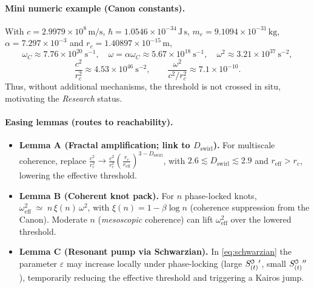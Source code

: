 \documentclass[reprint,aps,onecolumn,nofootinbib]{revtex4-2}
\newcommand{\swirlarrow}{%
    \mathchoice{\mkern-2mu\scriptstyle\boldsymbol{\circlearrowleft}}%
    {\mkern-2mu\scriptstyle\boldsymbol{\circlearrowleft}}%
    {\mkern-2mu\scriptscriptstyle\boldsymbol{\circlearrowleft}}%
    {\mkern-2mu\scriptscriptstyle\boldsymbol{\circlearrowleft}}%
}
\newcommand{\SwirlClock}{S_{(t)}^{\swirlarrow}}
\newcommand{\rc}{r_c}                                    %
\providecommand{\rc}{r_c}
\begin{document}
        \paragraph{Mini numeric example (Canon constants).}
            With $c=2.9979\times10^8\,\mathrm{m/s}$, $\hbar=1.0546\times10^{-34}\,\mathrm{J\,s}$,
            $m_e=9.1094\times10^{-31}\,\mathrm{kg}$, $\alpha=7.297\times10^{-3}$ and $\rc=1.40897\times10^{-15}\,\mathrm{m}$,
            \[
                \omega_C \!\approx\! 7.76\times10^{20}\ \mathrm{s^{-1}},
                \quad
                \omega=\alpha\omega_C \!\approx\! 5.67\times10^{18}\ \mathrm{s^{-1}},
                \quad
                \omega^2 \!\approx\! 3.21\times10^{37}\ \mathrm{s^{-2}},
            \]
            \[
                \frac{c^2}{\rc^2}\!\approx\! 4.53\times10^{46}\ \mathrm{s^{-2}},
                \qquad
                \frac{\omega^2}{c^2/\rc^2}\!\approx\! 7.1\times10^{-10}.
            \]
            Thus, without additional mechanisms, the threshold is not crossed in situ, motivating the \emph{Research} status.

        \paragraph{Easing lemmas (routes to reachability).}
            \begin{itemize}
            \item \textbf{Lemma A (Fractal amplification; link to $D_{\mathrm{swirl}}$).}
            For multiscale coherence, replace
            $\displaystyle \frac{c^2}{\rc^2}\to \frac{c^2}{\rc^2}\!\left(\frac{\rc}{r_{\mathrm{eff}}}\right)^{3-D_{\mathrm{swirl}}}$,
            with $2.6\!\lesssim\!D_{\mathrm{swirl}}\!\lesssim\!2.9$ and $r_{\mathrm{eff}}\!>\!\rc$,
            lowering the effective threshold.

            \item \textbf{Lemma B (Coherent knot pack).}
            For $n$ phase-locked knots,
            $\displaystyle \omega_{\mathrm{eff}}^2 \;\simeq\; n\,\xi(n)\,\omega^2$,
            with $\xi(n)=1-\beta\log n$ (coherence suppression from the Canon).
            Moderate $n$ (\emph{mesoscopic} coherence) can lift $\omega_{\mathrm{eff}}^2$ over the lowered threshold.

            \item \textbf{Lemma C (Resonant pump via Schwarzian).}
            In \eqref{eq:schwarzian} the parameter $\varepsilon$ may increase locally under phase-locking (large $\SwirlClock{'}$, small $\SwirlClock{''}$),
            temporarily reducing the effective threshold and triggering a Kairos jump.
            \end{itemize}
\end{document}
